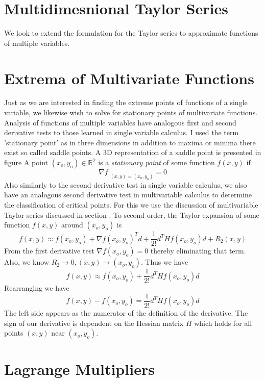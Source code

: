 \section{Multidimesnional Taylor Series}
We look to extend the formulation for the Taylor series to approximate functions of multiple variables. 

\section{Extrema of Multivariate Functions}
Just as we are interested in finding the extreme points of functions of a single variable, we likewise wish to solve for stationary points of multivariate functions. Analysis of functions of multiple variables have analogous first and second derivative tests to those learned in single variable calculus. I used the term 'stationary point' as in three dimensions in addition to maxima or minima there exist so called 
saddle points. A 3D representation of a saddle point is presented in figure 
 {A point $(x_o, y_o) \in \mathbb{R^2}$ is a \textit{stationary point} of some function $f(x,y)$ if
\[\nabla f \rvert_{(x, y) = (x_o, y_o)} = 0\]}
Also similarly to the second derivative test in single variable calculus, we also have an analogous second derivative test in multivariable calculus to determine the classification of critical points. For this we use the discussion of multivariable Taylor series discussed in section . To second order, the Taylor expansion of some function $f(x,y)$ around $(x_o, y_o)$ is
\[f(x,y) \approx f(x_o, y_o) + \nabla f(x_o, y_o)^T d + \frac{1}{2!}d^THf(x_o,y_o)d + R_2(x,y)\]
From the first derivative test $\nabla f(x_o, y_o) = 0$ thereby eliminating that term. Also, we know $R_2 \rightarrow 0, (x,y) \rightarrow (x_o, y_o)$. Thus we have
\[f(x,y) \approx f(x_o, y_o) + \frac{1}{2!}d^THf(x_o,y_o)d \]
Rearranging we have 
\[f(x,y) - f(x_o, y_o) = \frac{1}{2!}d^THf(x_o,y_o)d \]
The left side appears as the numerator of the definition of the derivative. The sign of our derivative is dependent on the Hessian matrix $H$ which holds for all points $(x,y)$ near $(x_o, y_o)$. 
\section{Lagrange Multipliers}

